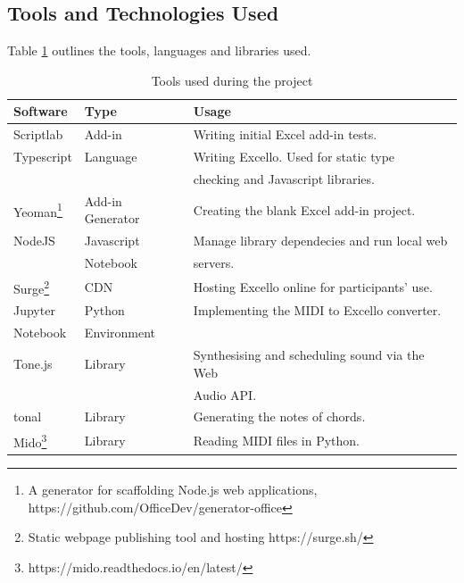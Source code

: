 \subsection{Tools and Technologies Used}

Table \ref{intro:tools} outlines the tools, languages and libraries used.

\begin{table}[ht]
\centering
\caption{Tools used during the project}
\vspace{1pt}
\begin{tabular}{|l|l|l|} \hline
\textbf{Software}&\textbf{Type}&\textbf{Usage}\\ \hline
Scriptlab&Add-in&Writing initial Excel add-in tests. \\ \hline
Typescript&Language&Writing Excello. Used for static type\\
&&checking and Javascript libraries. \\ \hline
Yeoman\footnote{A generator for scaffolding Node.js web applications, https://github.com/OfficeDev/generator-office}&Add-in Generator&Creating the blank Excel add-in project.\\ \hline
NodeJS&Javascript&Manage library dependecies and run local web\\
&Notebook&servers. \\ \hline
Surge\footnote{Static webpage publishing tool and hosting https://surge.sh/}&CDN&Hosting Excello online for participants' use.\\ \hline
Jupyter&Python&Implementing the MIDI to Excello converter.\\ Notebook&Environment& \\ \hline
Tone.js&Library&Synthesising and scheduling sound via the Web\\
&&Audio API.\\ \hline
tonal&Library&Generating the notes of chords.\\ \hline
Mido\footnote{https://mido.readthedocs.io/en/latest/}&Library&Reading MIDI files in Python.\\ \hline
\end{tabular}
\label{intro:tools}
\end{table}

